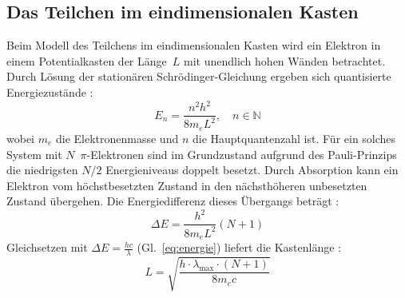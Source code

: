 \subsection{Das Teilchen im eindimensionalen Kasten}
Beim Modell des Teilchens im eindimensionalen Kasten wird ein Elektron in einem Potentialkasten der Länge~$L$ mit unendlich hohen Wänden betrachtet. Durch Lösung der stationären Schrödinger-Gleichung ergeben sich quantisierte Energiezustände \cite[122]{demtroder_experimentalphysik_2016}:
\begin{equation}
  E_n = \frac{n^2 h^2}{8 m_e L^2}, \quad n \in \mathbb{N}
  \label{eq:kasten-energie}
\end{equation}
wobei $m_e$ die Elektronenmasse und $n$ die Hauptquantenzahl ist. Für ein solches System mit $N$~$\pi$-Elektronen sind im Grundzustand aufgrund des Pauli-Prinzips die niedrigsten $N/2$ Energieniveaus doppelt besetzt. Durch Absorption kann ein Elektron vom höchstbesetzten Zustand in den nächsthöheren unbesetzten Zustand übergehen. Die Energiedifferenz dieses Übergangs beträgt \cite[26]{skript}:
\begin{equation}
  \Delta E = \frac{h^2}{8 m_e L^2}(N+1)
  \label{eq:energie-potentialtopf}
\end{equation}
Gleichsetzen mit $\Delta E = \frac{hc}{\lambda}$ (Gl.~\ref{eq:energie}) liefert die Kastenlänge \cite[123]{demtroder_experimentalphysik_2016}:
\begin{equation}
  L = \sqrt{\frac{h \cdot \lambda_{\text{max}} \cdot (N+1)}{8 m_e c}}
  \label{eq:kastenlänge}
\end{equation}
\pagebreak